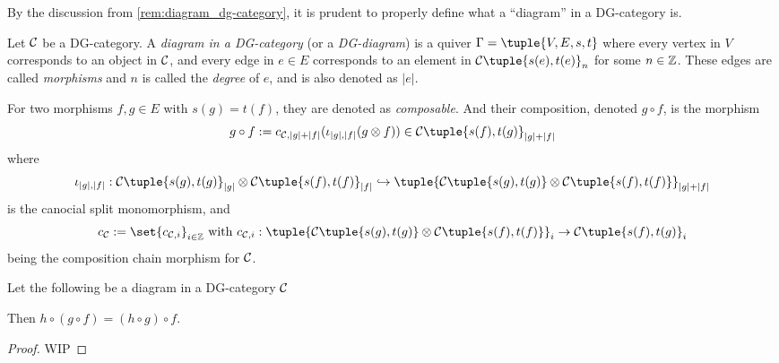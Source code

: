 \begin{notation}
    By the discussion from \autoref{rem:diagram_dg-category}, it is prudent to properly define what a ``diagram'' in a DG-category is.

    Let \( {\mathcal{C}} \) be a DG-category. A \emph{diagram in a DG-category} (or a \emph{DG-diagram}) is a quiver \( \Gamma = \tuple{V, E, s, t} \) where every vertex in \( V \) corresponds to an object in \( {\mathcal{C}} \), and every edge in \( e \in E \) corresponds to an element in \( \Cc\tuple{s(e), t(e)}_n \) for some \( n \in {\mathbb{Z}} \). These edges are called \emph{morphisms} and \( n \) is called the \emph{degree} of \( e \), and is also denoted as \( |e| \).

    For two morphisms \( f, g \in E \) with \( s(g) = t(f) \), they are denoted as \emph{composable}. And their composition, denoted \( g \circ f \), is the morphism
    \[
        g \circ f := c_{\Cc, |g| + |f|}(\iota_{|g|, |f|}(g \otimes f)) \in \Cc\tuple{s(f), t(g)}_{|g| + |f|}
    \]
    where
    \[
        \iota_{|g|, |f|}: \Cc\tuple{s(g), t(g)}_{|g|} \otimes \Cc\tuple{s(f), t(f)}_{|f|} \hookrightarrow \tuple{ \Cc\tuple{s(g), t(g)} \otimes \Cc\tuple{s(f), t(f)} }_{|g| + |f|}
    \]
    is the canocial split monomorphism, and
    \[
        c_{\Cc} := \set{c_{\Cc, i}}_{i \in \Zb} \text{ with } c_{\Cc, i}: \tuple{ \Cc\tuple{s(g), t(g)} \otimes \Cc\tuple{s(f), t(f)} }_i \to \Cc\tuple{s(f), t(g)}_i
    \]
    being the composition chain morphism for \( {\mathcal{C}} \).
\end{notation}
\begin{lemma}
    Let the following be a diagram in a DG-category \( {\mathcal{C}} \)
    \begin{center}
    \end{center}

    Then \( h \circ (g \circ f) = (h \circ g) \circ f \).
\end{lemma}
\begin{proof}
    WIP
\end{proof}

